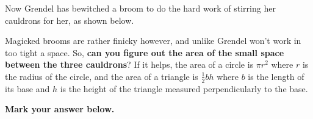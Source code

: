 


Now Grendel has bewitched a broom to do the hard work of stirring her
cauldrons for her, as shown below.

\begin{center}
\end{center}

Magicked brooms are rather finicky however, and unlike Grendel won't work
in too tight a space. So, \textbf{can you figure out the area of the small
space between the three cauldrons}? If it helps, the area of a circle is
\(\pi r^2\) where \(r\) is the radius of the circle, and the area of
a triangle is \(\frac{1}{2}bh\) where \(b\) is the length of its base
and \(h\) is the height of the triangle measured perpendicularly to the base.

\vspace{2em}

\textbf{Mark your answer below.}

